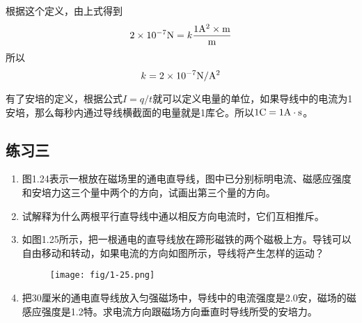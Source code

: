 根据这个定义，由上式得到
\[ 2\times10^{-7} {\rm N}=k\frac{1{\rm A^2}\times {\rm m}}{\rm m}\]
所以
\[k=2\times10^{-7}{{\rm N}/{\rm A^2}}\]

有了安培的定义，根据公式$I=q/t$就可以定义电量的单位，如果导线中的电流为1安培，那么每秒内通过导线横截面的电量就是1库仑。所以$1{\rm C}=1{\rm A}\cdot {\rm s}$。

\subsection*{练习三}
\begin{enumerate}
    \item 图1.24表示一根放在磁场里的通电直导线，图中已分别标明电流、磁感应强度和安培力这三个量中两个的方向，试画出第三个量的方向。
    \begin{figure}[htp]\centering
{}
    	\caption{ }
    \end{figure}
    \item 试解释为什么两根平行直导线中通以相反方向电流时，它们互相推斥。
    \item 如图1.25所示，把一根通电的直导线放在蹄形磁铁的两个磁极上方。导钱可以自由移动和转动，如果电流的方向如图所示，导线将产生怎样的运动？
        \begin{figure}[htp]\centering
    	\texttt{[image: fig/1-25.png]}
    	\caption{ }
    \end{figure}
    \item 把30厘米的通电直导线放入匀强磁场中，导线中的电流强度是2.0安，磁场的磁感应强度是1.2特。求电流方向跟磁场方向垂直时导线所受的安培力。

\begin{figure}[htp]
\centering
\begin{minipage}[t]{0.48\textwidth}
\centering
{}
\end{minipage}
\end{figure}
\end{enumerate}
